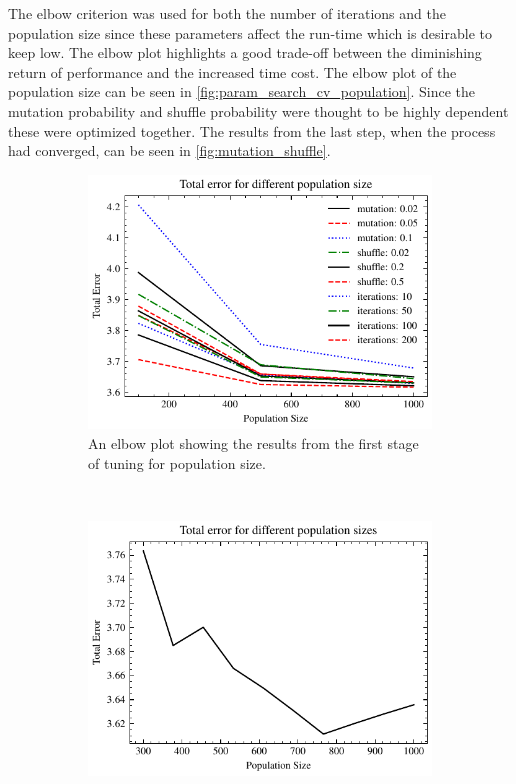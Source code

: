 The elbow criterion was used for both the number of iterations and the population size since these parameters affect the run-time which is desirable to keep low.
The elbow plot highlights a good trade-off between the diminishing return of performance and the increased time cost.
The elbow plot of the population size can be seen in \cref{fig:param_search_cv_population}.
Since the mutation probability and shuffle probability were thought to be highly dependent these were optimized together.
The results from the last step, when the process had converged, can be seen in \cref{fig:mutation_shuffle}.

\begin{figure}[t!]
    \centering
    \begin{subfigure}[t]{0.45\textwidth}
        \centering
        \includegraphics[width=\textwidth]{chapters/figures/implementation_plots/population_plot_stage1.pdf}
        \captionsetup{width=.9\linewidth}
        \caption{An elbow plot showing the results from the first stage of tuning for population size.}
    \end{subfigure}%
    ~ 
    \begin{subfigure}[t]{0.45\textwidth}
        \centering
        \includegraphics[width=\textwidth]{chapters/figures/population_plot.pdf}

\end{subfigure}
\end{figure}

